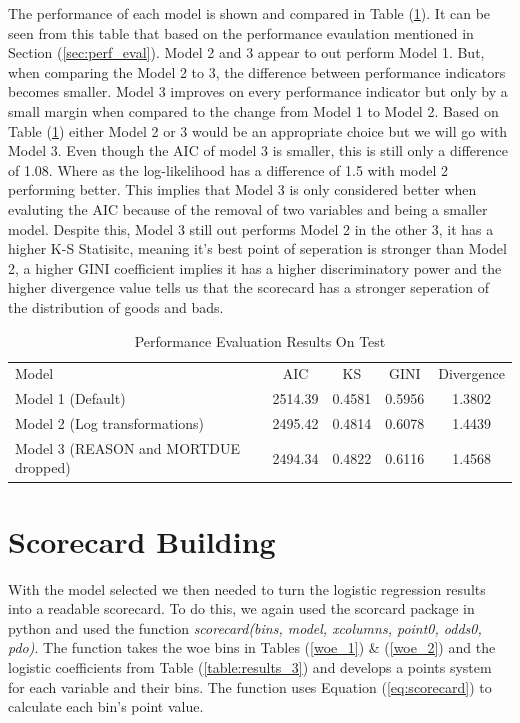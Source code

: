 The performance of each model is shown and compared in Table (\ref{perf_eval}). It can be seen from this table that based on the performance evaulation mentioned in Section (\ref{sec:perf_eval}). Model 2 and 3 appear to out perform Model 1. But, when comparing the Model 2 to 3, the difference between performance indicators becomes smaller. Model 3 improves on every performance indicator but only by a small margin when compared to the change from Model 1 to Model 2. Based on Table (\ref{perf_eval}) either Model 2 or 3 would be an appropriate choice but we will go with Model 3. Even though the AIC of model 3 is smaller, this is still only a difference of 1.08. Where as the log-likelihood has a difference of 1.5 with model 2 performing better. This implies that Model 3 is only considered better when evaluting the AIC because of the removal of two variables and being a smaller model. Despite this, Model 3 still out performs Model 2 in the other 3, it has a higher K-S Statisitc, meaning it's best point of seperation is stronger than Model 2, a higher GINI coefficient implies it has a higher discriminatory power and the higher divergence value tells us that the scorecard has a stronger seperation of the distribution of goods and bads. \\

\begin{table}[H]
\begin{center}
\renewcommand{\arraystretch}{1.25}
\begin{tabular}{lcccc}
\toprule
Model & AIC & KS & GINI & Divergence \\
Model 1 (Default) & 2514.39 & 0.4581 & 0.5956 & 1.3802  \\
Model 2 (Log transformations) & 2495.42 & 0.4814 & 0.6078 & 1.4439  \\
Model 3 (REASON and MORTDUE dropped) & 2494.34 & 0.4822 & 0.6116 & 1.4568 \\
\bottomrule
\end{tabular}
\caption{Performance Evaluation Results On Test \label{perf_eval}}
\end{center}
\end{table}

\section{Scorecard Building}

With the model selected we then needed to turn the logistic regression results into a readable scorecard. To do this, we again used the scorcard package in python \parencite{statsmodels} and used the function \textit{scorecard(bins, model, xcolumns, point0, odds0, pdo)}. The function takes the woe bins in Tables (\ref{woe_1}) \& (\ref{woe_2}) and the logistic coefficients from Table (\ref{table:results_3}) and develops a points system for each variable and their bins. The function uses Equation (\ref{eq:scorecard}) to calculate each bin's point value.\\

